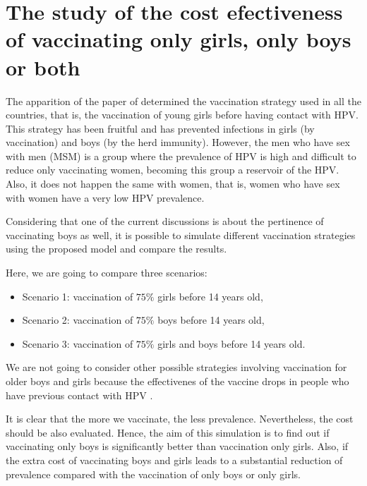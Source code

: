 \section{The study of the cost efectiveness of vaccinating only girls, only boys or both}\label{coste_efectividad}

The apparition of the paper of \cite{elbasha2007model} determined the vaccination strategy used in all the countries, that is, the vaccination of young girls before having contact with HPV. This strategy has been fruitful and has prevented infections in girls (by vaccination) and boys (by the herd immunity). However, the men who have sex with men (MSM) is a group where the prevalence of HPV is high and difficult to reduce only vaccinating women, becoming this group a reservoir of the HPV. Also, it does not happen the same with women, that is, women who have sex with women have a very low HPV prevalence.

Considering that one of the current discussions is about the pertinence of vaccinating boys as well, it is possible to simulate different vaccination strategies using the proposed model and compare the results.

Here, we are going to compare three scenarios:

\begin{itemize}
	\item Scenario 1: vaccination of $75\%$ girls before 14 years old,
	\item Scenario 2: vaccination of $75\%$ boys before 14 years old,
	\item Scenario 3: vaccination of $75\%$ girls and boys before 14 years old.
\end{itemize} 

We are not going to consider other possible strategies involving vaccination for older boys and girls because the effectivenes of the vaccine drops in people who have previous contact with HPV \cite{Skufca}. 

It is clear that the more we vaccinate, the less prevalence. Nevertheless, the cost should be also evaluated. Hence, the aim of this simulation is to find out if vaccinating only boys is significantly better than vaccination only girls. Also, if the extra cost of vaccinating boys and girls leads to a substantial reduction of prevalence compared with the vaccination of only boys or only girls. 

